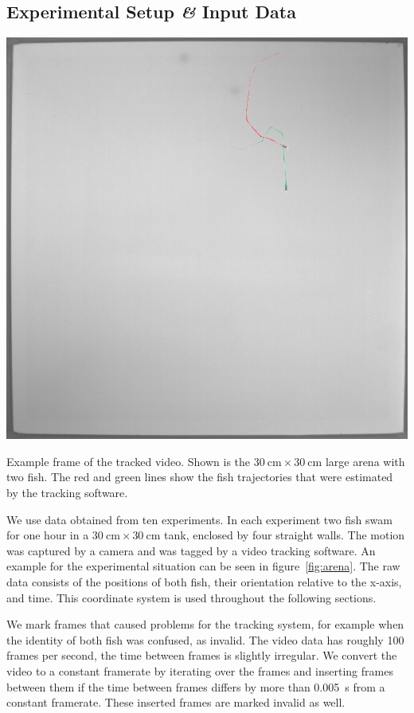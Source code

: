 \documentclass[nobib, a4paper]{tufte-handout}
\begin{document}
\subsection{Experimental Setup \textit{\&} Input Data}
\begin{marginfigure}
\includegraphics[width=\columnwidth]{tracked_frame}
\caption{Example frame of the tracked video.
  Shown is the \(\SI{30}{\cm} \times \SI{30}{\cm}\) large arena with two fish.
  The red and green lines show the fish trajectories that were estimated by the tracking software.
\label{fig:arena}}
\end{marginfigure}

We use data obtained from ten experiments.
In each experiment two fish swam for one hour in a \(\SI{30}{\cm} \times \SI{30}{\cm}\) tank, enclosed by four straight walls.
The motion was captured by a camera and was tagged by a video tracking software.
An example for the experimental situation can be seen in figure~\ref{fig:arena}.
The raw data consists of the positions of both fish, their orientation relative to the x-axis, and time.
This coordinate system is used throughout the following sections.

We mark frames that caused problems for the tracking system, for example when the identity of both fish was confused, as invalid.
The video data has roughly 100 frames per second, the time between frames is slightly irregular.
We convert the video to a constant framerate by iterating over the frames and inserting frames between them if the time between frames differs by more than \SI{0.005}{\s} from a constant framerate.
These inserted frames are marked invalid as well.
\end{document}
